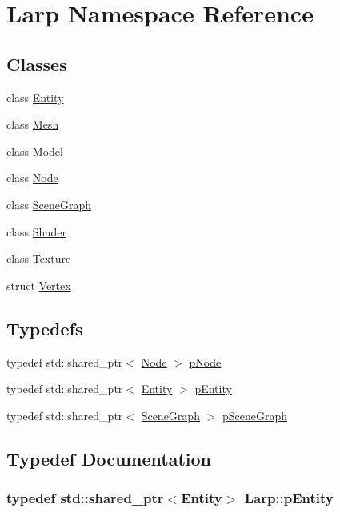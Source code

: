 \hypertarget{namespaceLarp}{}\section{Larp Namespace Reference}
\label{namespaceLarp}
\subsection*{Classes}
\begin{DoxyCompactItemize}
\item 
class \hyperlink{classLarp_1_1Entity}{Entity}
\item 
class \hyperlink{classLarp_1_1Mesh}{Mesh}
\item 
class \hyperlink{classLarp_1_1Model}{Model}
\item 
class \hyperlink{classLarp_1_1Node}{Node}
\item 
class \hyperlink{classLarp_1_1SceneGraph}{Scene\+Graph}
\item 
class \hyperlink{classLarp_1_1Shader}{Shader}
\item 
class \hyperlink{classLarp_1_1Texture}{Texture}
\item 
struct \hyperlink{structLarp_1_1Vertex}{Vertex}
\end{DoxyCompactItemize}
\subsection*{Typedefs}
\begin{DoxyCompactItemize}
\item 
typedef std\+::shared\+\_\+ptr$<$ \hyperlink{classLarp_1_1Node}{Node} $>$ \hyperlink{namespaceLarp_a57e9a3e29e68cdf508c964274d9ac1a4}{p\+Node}
\item 
typedef std\+::shared\+\_\+ptr$<$ \hyperlink{classLarp_1_1Entity}{Entity} $>$ \hyperlink{namespaceLarp_aca47662468377e5aaf9a665699a4d97f}{p\+Entity}
\item 
typedef std\+::shared\+\_\+ptr$<$ \hyperlink{classLarp_1_1SceneGraph}{Scene\+Graph} $>$ \hyperlink{namespaceLarp_a590f73362521ab6a9c682d4eb2719002}{p\+Scene\+Graph}
\end{DoxyCompactItemize}


\subsection{Typedef Documentation}
\subsubsection[{\texorpdfstring{p\+Entity}{pEntity}}]{\setlength{\rightskip}{0pt plus 5cm}typedef std\+::shared\+\_\+ptr$<${\bf Entity}$>$ {\bf Larp\+::p\+Entity}}\hypertarget{namespaceLarp_aca47662468377e5aaf9a665699a4d97f}{}\label{namespaceLarp_aca47662468377e5aaf9a665699a4d97f}
